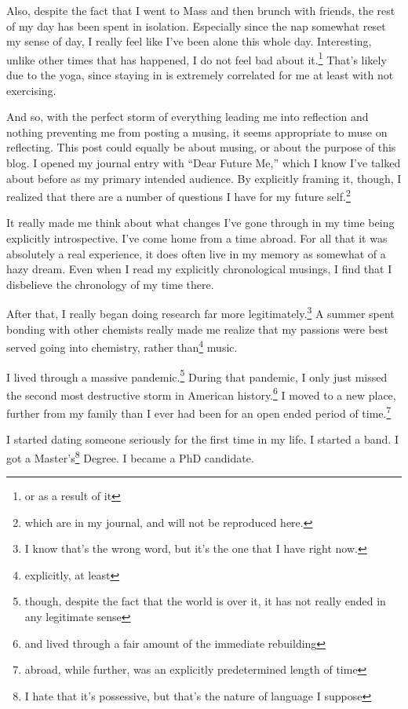 \documentclass[12pt]{article}[titlepage]
\newcommand{\say}[1]{``#1''}
\renewcommand{\,}{\textsuperscript{,}}
\begin{document}
Also, despite the fact that I went to Mass and then brunch with friends, the rest of my day has been spent in isolation.
Especially since the nap somewhat reset my sense of day, I really feel like I've been alone this whole day.
Interesting, unlike other times that has happened, I do not feel bad about it.\footnote{or as a result of it}
That's likely due to the yoga, since staying in is extremely correlated for me at least with not exercising.

And so, with the perfect storm of everything leading me into reflection and nothing preventing me from posting a musing, it seems appropriate to muse on reflecting.
This post could equally be about musing, or about the purpose of this blog.
I opened my journal entry with \say{Dear Future Me,} which I know I've talked about before as my primary intended audience.
By explicitly framing it, though, I realized that there are a number of questions I have for my future self.\footnote{which are in my journal, and will not be reproduced here.}

It really made me think about what changes I've gone through in my time being explicitly introspective.
I've come home from a time abroad.
For all that it was absolutely a real experience, it does often live in my memory as somewhat of a hazy dream.
Even when I read my explicitly chronological musings, I find that I disbelieve the chronology of my time there.

After that, I really began doing research far more legitimately.\footnote{I know that's the wrong word, but it's the one that I have right now.}
A summer spent bonding with other chemists really made me realize that my passions were best served going into chemistry, rather than\footnote{explicitly, at least} music.

I lived through a massive pandemic.\footnote{though, despite the fact that the world is over it, it has not really ended in any legitimate sense}
During that pandemic, I only just missed the second most destructive storm in American history.\footnote{and lived through a fair amount of the immediate rebuilding}
I moved to a new place, further from my family than I ever had been for an open ended period of time.\footnote{abroad, while further, was an explicitly predetermined length of time}

I started dating someone seriously for the first time in my life.
I started a band.
I got a Master's\footnote{I hate that it's possessive, but that's the nature of language I suppose} Degree.
I became a PhD candidate.
\end{document}
